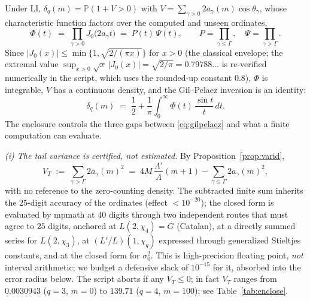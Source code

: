 \documentclass[11pt]{article}
\begin{document}
Under LI, $\delta_q(m)=\mathbb P(1+V>0)$ with
$V=\sum_{\gamma>0}2a_\gamma(m)\cos\theta_\gamma$, whose characteristic
function factors over the computed and unseen ordinates,
\[
\Phi(t)\;=\;\prod_{\gamma>0}J_0\bigl(2a_\gamma t\bigr)
\;=\;P(t)\,\Psi(t),\qquad
P=\prod_{\gamma\le\Gamma},\quad \Psi=\prod_{\gamma>\Gamma}.
\]
Since $|J_0(x)|\le\min\{1,\sqrt{2/(\pi x)}\}$ for $x>0$ (the classical
envelope; the extremal value $\sup_{x>0}\sqrt x\,|J_0(x)|=\sqrt{2/\pi}
=0.79788\ldots$ is re-verified numerically in the script, which uses
the rounded-up constant $0.8$), $\Phi$ is integrable, $V$ has a
continuous density, and the Gil--Pelaez inversion is an identity:
\begin{equation}\label{eq:gilpelaez}
\delta_q(m)\;=\;\frac12+\frac1\pi\int_0^\infty
\Phi(t)\,\frac{\sin t}{t}\,dt .
\end{equation}
The enclosure controls the three gaps between \eqref{eq:gilpelaez} and
what a finite computation can evaluate.

\emph{(i) The tail variance is certified, not estimated.} By
Proposition~\ref{prop:varid},
\[
V_T\;:=\;\sum_{\gamma>\Gamma}2a_\gamma(m)^2
\;=\;4M\,\frac{\Lambda'}{\Lambda}(m+1)-\sum_{\gamma\le\Gamma}2a_\gamma(m)^2 ,
\]
with no reference to the zero-counting density. The subtracted finite
sum inherits the $25$-digit accuracy of the ordinates (effect
$<10^{-20}$); the closed form is evaluated by mpmath at $40$ digits
through two independent routes that must agree to $25$ digits, anchored
at $L(2,\chi_4)=G$ (Catalan), at a directly summed series for
$L(2,\chi_3)$, at $(L'/L)(1,\chi_q)$ expressed through generalized
Stieltjes constants, and at the closed form for $\sigma_0^2$. This is
high-precision floating point, \emph{not} interval arithmetic; we
budget a defensive slack of $10^{-15}$ for it, absorbed into the error
radius below. The script aborts if any $V_T\le0$; in fact
$V_T$ ranges from $0.0030943$ ($q=3$, $m=0$) to $139.71$
($q=4$, $m=100$); see Table~\ref{tab:enclose}.
\end{document}
